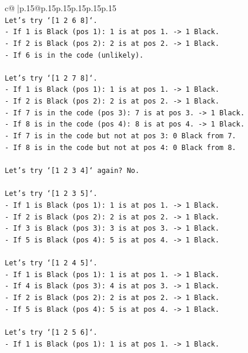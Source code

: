 \documentclass{article}
\begin{document}
{\begin{supertabular}{c@{$\;$}|p{.15\linewidth}@{}p{.15\linewidth}p{.15\linewidth}p{.15\linewidth}p{.15\linewidth}p{.15\linewidth}}
{{{\\ 
\texttt{Let's try `{[}1 2 6 8{]}`.} \\
\texttt{{-} If 1 is Black (pos 1): 1 is at pos 1. {-}> 1 Black.} \\
\texttt{{-} If 2 is Black (pos 2): 2 is at pos 2. {-}> 1 Black.} \\
\texttt{{-} If 6 is in the code (unlikely).} \\
\\ 
\texttt{Let's try `{[}1 2 7 8{]}`.} \\
\texttt{{-} If 1 is Black (pos 1): 1 is at pos 1. {-}> 1 Black.} \\
\texttt{{-} If 2 is Black (pos 2): 2 is at pos 2. {-}> 1 Black.} \\
\texttt{{-} If 7 is in the code (pos 3): 7 is at pos 3. {-}> 1 Black.} \\
\texttt{{-} If 8 is in the code (pos 4): 8 is at pos 4. {-}> 1 Black.} \\
\texttt{{-} If 7 is in the code but not at pos 3: 0 Black from 7.} \\
\texttt{{-} If 8 is in the code but not at pos 4: 0 Black from 8.} \\
\\ 
\texttt{Let's try `{[}1 2 3 4{]}` again? No.} \\
\\ 
\texttt{Let's try `{[}1 2 3 5{]}`.} \\
\texttt{{-} If 1 is Black (pos 1): 1 is at pos 1. {-}> 1 Black.} \\
\texttt{{-} If 2 is Black (pos 2): 2 is at pos 2. {-}> 1 Black.} \\
\texttt{{-} If 3 is Black (pos 3): 3 is at pos 3. {-}> 1 Black.} \\
\texttt{{-} If 5 is Black (pos 4): 5 is at pos 4. {-}> 1 Black.} \\
\\ 
\texttt{Let's try `{[}1 2 4 5{]}`.} \\
\texttt{{-} If 1 is Black (pos 1): 1 is at pos 1. {-}> 1 Black.} \\
\texttt{{-} If 4 is Black (pos 3): 4 is at pos 3. {-}> 1 Black.} \\
\texttt{{-} If 2 is Black (pos 2): 2 is at pos 2. {-}> 1 Black.} \\
\texttt{{-} If 5 is Black (pos 4): 5 is at pos 4. {-}> 1 Black.} \\
\\ 
\texttt{Let's try `{[}1 2 5 6{]}`.} \\
\texttt{{-} If 1 is Black (pos 1): 1 is at pos 1. {-}> 1 Black.} \\
}}}
\end{supertabular}}
\end{document}

